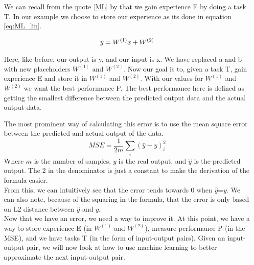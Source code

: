 We can recall from the quote \ref{ML} by \cite{MitchellTomM1997Ml} that we gain experience E by doing a task T. In our example we choose to store our experience as its done in equation \ref{eq:ML_lin}.
    
\begin{equation}
y=W^{(1)}x+W^{(2)}\\
\label{eq:ML_lin}
\end{equation}

Here, like before, our output is y, and our input is x. We have replaced a and b with new placeholders $W^{(1)}$ and $W^{(2)}$.
Now our goal is to, given a task T, gain experience E and store it in $W^{(1)}$ and $W^{(2)}$. With our values for $W^{(1)}$ and $W^{(2)}$ we want the best performance P.  The best performance here is defined as getting the smallest difference between the predicted output data and the actual output data. 


The most prominent way of calculating this error is to use the mean square error between the predicted and actual output of the data. 
\begin{equation}\label{MSE_form}
     MSE=\frac{1}{2m} \sum_i (\hat{y}-y)_i^2
\end{equation}
Where $m$ is the number of samples, $y$ is the real output, and $\hat{y}$ is the predicted output. The 2 in the denominator is just a constant to make the derivation of the formula easier.\\
From this, we can intuitively see that the error tends towards 0 when $\hat{y}$=$y$. We can also note, because of the squaring in the formula, that the error is only based on L2 distance between $\hat{y}$ and $y$.\\
Now that we have an error, we need a way to improve it.
At this point, we have a way to store experience E (in  $W^{(1)}$ and $W^{(2)}$), measure performance P (in the MSE), and we have tasks T (in the form of input-output pairs).
Given an input-output pair, we will now look at how to use machine learning to better approximate the next input-output pair.


